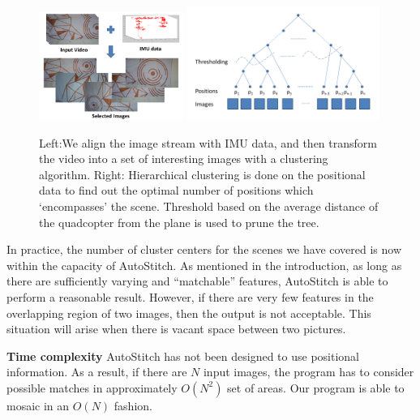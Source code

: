 
\begin{figure}[t!]
  \centering
  \includegraphics[width=0.42\textwidth]{figures/vacantSpaces/selection} 
  \includegraphics[width=0.56\textwidth]{figures/vacantSpaces/clustering}
  \caption[Selection of Images]{ \label{fig:selection} Left:We align the image
  stream with IMU data, and then transform the video into a set of interesting
    images with a clustering algorithm. Right: Hierarchical clustering is done
    on the positional data to find out the optimal number of positions which
    `encompasses' the scene. Threshold based on the average distance of the
    quadcopter from the plane is used to prune the tree.}
\end{figure}    

In practice, the number of cluster centers for the scenes we have
covered is now within the capacity of AutoStitch.  As mentioned in the
introduction, as long as there are sufficiently varying and
``matchable'' features, AutoStitch is able to perform a reasonable
result.  However, if there are very few features in the overlapping region
of two images, then the output is not acceptable. This situation will
arise when there is vacant space between two pictures.

{\bf Time complexity} AutoStitch has not been designed
to use positional information. As a result, if there are $N$ input
images, the program has to consider possible matches in approximately
$O(N^2)$ set of areas.  Our program is able to mosaic in an $O(N)$
fashion.

